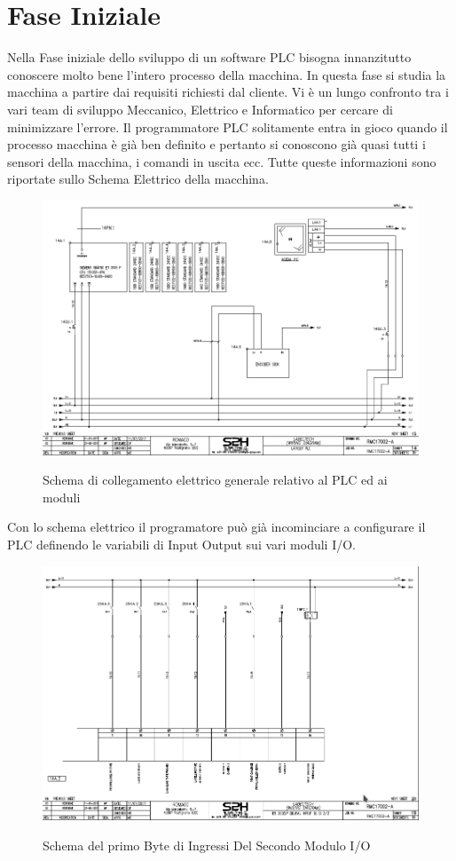 \documentclass[12pt, a4paper, oneside]{book}
\begin{document}
\section{Fase Iniziale }
Nella Fase iniziale dello sviluppo di un software PLC bisogna innanzitutto conoscere molto bene l'intero processo della macchina. In questa fase si studia la macchina a partire dai requisiti richiesti dal cliente. Vi è un lungo confronto tra i vari team di sviluppo Meccanico, Elettrico e Informatico per cercare di minimizzare l'errore. Il programmatore PLC solitamente entra in gioco quando il processo macchina è già ben definito e pertanto si conoscono già quasi tutti i sensori della macchina, i comandi in uscita ecc. 
Tutte queste informazioni sono riportate sullo Schema Elettrico della macchina.

\begin{figure}[H]
	\centering
	\includegraphics[width=12cm]{Immagini/SCELE1}
	\label{scele1}
	\caption{Schema di collegamento elettrico generale relativo al PLC ed ai moduli }
\end{figure}


Con lo schema elettrico il programatore può già incominciare a configurare il PLC definendo le variabili di Input Output sui vari moduli I/O. 

\begin{figure}[H]
	\centering
	\includegraphics[width=12cm]{Immagini/SCELE2}
	\label{scele2}
	\caption{Schema del primo Byte di Ingressi Del Secondo Modulo I/O}
\end{figure}
\end{document}
